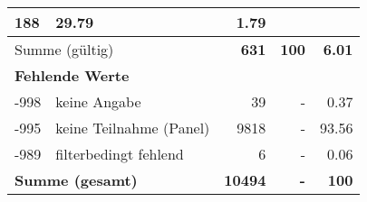 \begin{longtable}{lXrrr}
       \num{188} &
       \num[round-mode=places,round-precision=2]{29.79} &
         \num[round-mode=places,round-precision=2]{1.79} \\
     \midrule
     \multicolumn{2}{l}{Summe (gültig)} &
       \textbf{\num{631}} &
     \textbf{\num{100}} &
       \textbf{\num[round-mode=places,round-precision=2]{6.01}} \\
     \multicolumn{5}{l}{\textbf{Fehlende Werte}}\\
       -998 &
       keine Angabe &
         \num{39} &
        - &
         \num[round-mode=places,round-precision=2]{0.37} \\
       -995 &
       keine Teilnahme (Panel) &
         \num{9818} &
        - &
         \num[round-mode=places,round-precision=2]{93.56} \\
       -989 &
       filterbedingt fehlend &
         \num{6} &
        - &
         \num[round-mode=places,round-precision=2]{0.06} \\
     \midrule
     \multicolumn{2}{l}{\textbf{Summe (gesamt)}} &
          \textbf{\num{10494}} &
        \textbf{-} &
        \textbf{\num{100}} \\
     \bottomrule
     \end{longtable}
     
